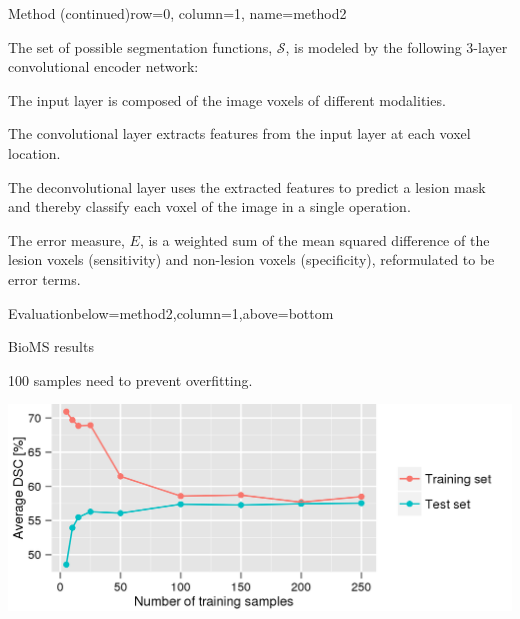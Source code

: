 \documentclass[%
landscape,
a0paper,
margin=2cm,
fontscale=0.3
]{baposter}
\newcommand{\vect}[1]{\vec{#1}}
\begin{document}
\begin{poster}
\begin{headerblock}{Method (continued)}{row=0, column=1, name=method2}
\begin{compactitem}
\item The set of possible segmentation functions, $\mathcal{S}$, is modeled by
the following 3-layer convolutional encoder network:
\end{compactitem}
\vspace{1em}

\begin{compactitem}
\item The input layer is composed of the image voxels of different modalities.
\item The convolutional layer extracts features from the input layer at
each voxel location.
\item The deconvolutional layer uses the extracted features to predict a lesion
mask and thereby classify each voxel of the image in a single operation.
\item The error measure, $E$, is a weighted sum of the mean squared
difference of the lesion voxels (sensitivity) and non-lesion voxels
(specificity), reformulated to be error terms.
\end{compactitem}
\end{headerblock}

\begin{headerblock}{Evaluation}{below=method2,column=1,above=bottom}
\begin{compactitem}
\item BioMS results
\item 100 samples need to prevent overfitting.
\end{compactitem}
\begin{center}
\includegraphics[width=\textwidth]{figures/train_count}
\end{center}
\end{headerblock}


\end{poster}
\end{document}
